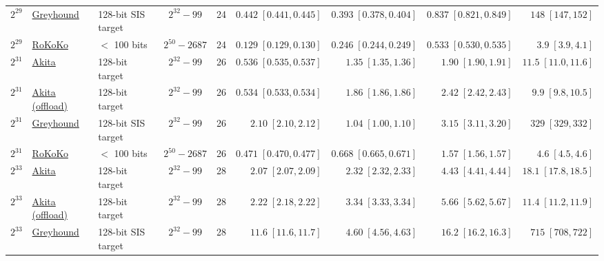 \begin{table}[H]
\begin{tabular}{@{}lllccrrrr@{}}
$2^{29}$ & \href{https://github.com/LayerZero-Labs/greyhound-reference/commit/672e74100496f6ef698ba35e241cf7593e3d57af}{Greyhound} & 128-bit SIS target & $2^{32}-99$ & 24 & $0.442\;[0.441, 0.445]$ & $0.393\;[0.378, 0.404]$ & $0.837\;[0.821, 0.849]$ & $148\;[147, 152]$ \\
$2^{29}$ & \href{https://github.com/lattice-arguments/rokoko/commit/5caba472334f7764645ea2c7c5d612353a670121}{RoKoKo} & $<$ 100 bits & $2^{50}-2687$ & 24 & $0.129\;[0.129, 0.130]$ & $0.246\;[0.244, 0.249]$ & $0.533\;[0.530, 0.535]$ & $3.9\;[3.9, 4.1]$ \\
\addlinespace
$2^{31}$ & \href{https://github.com/LayerZero-Labs/akita/commit/12d486b0bca2814956d480aa121130e2702f8612}{Akita} & 128-bit target & $2^{32}-99$ & 26 & $0.536\;[0.535, 0.537]$ & $1.35\;[1.35, 1.36]$ & $1.90\;[1.90, 1.91]$ & $11.5\;[11.0, 11.6]$ \\
$2^{31}$ & \href{https://github.com/LayerZero-Labs/akita/commit/12d486b0bca2814956d480aa121130e2702f8612}{Akita (offload)} & 128-bit target & $2^{32}-99$ & 26 & $0.534\;[0.533, 0.534]$ & $1.86\;[1.86, 1.86]$ & $2.42\;[2.42, 2.43]$ & $9.9\;[9.8, 10.5]$ \\
$2^{31}$ & \href{https://github.com/LayerZero-Labs/greyhound-reference/commit/672e74100496f6ef698ba35e241cf7593e3d57af}{Greyhound} & 128-bit SIS target & $2^{32}-99$ & 26 & $2.10\;[2.10, 2.12]$ & $1.04\;[1.00, 1.10]$ & $3.15\;[3.11, 3.20]$ & $329\;[329, 332]$ \\
$2^{31}$ & \href{https://github.com/lattice-arguments/rokoko/commit/5caba472334f7764645ea2c7c5d612353a670121}{RoKoKo} & $<$ 100 bits & $2^{50}-2687$ & 26 & $0.471\;[0.470, 0.477]$ & $0.668\;[0.665, 0.671]$ & $1.57\;[1.56, 1.57]$ & $4.6\;[4.5, 4.6]$ \\
\addlinespace
$2^{33}$ & \href{https://github.com/LayerZero-Labs/akita/commit/12d486b0bca2814956d480aa121130e2702f8612}{Akita} & 128-bit target & $2^{32}-99$ & 28 & $2.07\;[2.07, 2.09]$ & $2.32\;[2.32, 2.33]$ & $4.43\;[4.41, 4.44]$ & $18.1\;[17.8, 18.5]$ \\
$2^{33}$ & \href{https://github.com/LayerZero-Labs/akita/commit/12d486b0bca2814956d480aa121130e2702f8612}{Akita (offload)} & 128-bit target & $2^{32}-99$ & 28 & $2.22\;[2.18, 2.22]$ & $3.34\;[3.33, 3.34]$ & $5.66\;[5.62, 5.67]$ & $11.4\;[11.2, 11.9]$ \\
$2^{33}$ & \href{https://github.com/LayerZero-Labs/greyhound-reference/commit/672e74100496f6ef698ba35e241cf7593e3d57af}{Greyhound} & 128-bit SIS target & $2^{32}-99$ & 28 & $11.6\;[11.6, 11.7]$ & $4.60\;[4.56, 4.63]$ & $16.2\;[16.2, 16.3]$ & $715\;[708, 722]$ \\

\end{tabular}
\end{table}
